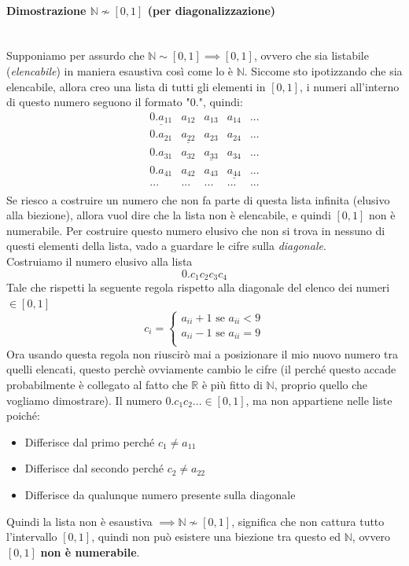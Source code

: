 \documentclass{article}
\begin{document}
\paragraph{Dimostrazione $\mathbb{N}\nsim[0,1]$ (per diagonalizzazione)}\mbox{}\\Supponiamo per assurdo che $\mathbb{N}\sim[0,1]\implies[0,1]$,
ovvero che sia listabile (\textit{elencabile}) in maniera esaustiva così come lo è $\mathbb{N}$.
Siccome sto ipotizzando che sia elencabile, allora creo una lista di tutti gli elementi in $[0,1]$, i numeri
all'interno di questo numero seguono il formato "$0.$", quindi:
\[
    \begin{array}{ccccc}
        \underline{0.a_{11}} & a_{12}             & a_{13}             & a_{14}             & ... \\
        0.a_{21}             & \underline{a_{22}} & a_{23}             & a_{24}             & ... \\
        0.a_{31}             & a_{32}             & \underline{a_{33}} & a_{34}             & ... \\
        0.a_{41}             & a_{42}             & a_{43}             & \underline{a_{44}} & ... \\
        ...                  & ...                  & ...                  & ...                  & ... \\
    \end{array}
\]
Se riesco a costruire un numero che non fa parte di questa lista infinita (elusivo alla biezione),
allora vuol dire che la lista non è elencabile, e quindi $[0,1]$ non è numerabile.
Per costruire questo numero elusivo che non si trova in nessuno di questi elementi della lista,
vado a guardare le cifre sulla \textit{diagonale}.\\Costruiamo il numero elusivo alla lista
$$0.c_1c_2c_3c_4$$
Tale che rispetti la seguente regola rispetto alla diagonale del elenco dei numeri $\in [0,1]$
\[
    c_i=
    \begin{cases}
        a_{ii} + 1\text{ se }a_{ii} < 9 \\
        a_{ii} - 1\text{ se }a_{ii} = 9 \\
    \end{cases}
\]
Ora usando questa regola non riuscirò mai a posizionare il mio nuovo numero
tra quelli elencati, questo perchè ovviamente cambio le cifre (il perché questo accade
probabilmente è collegato al fatto che $\mathbb{R}$ è più fitto di $\mathbb{N}$, proprio
quello che vogliamo dimostrare).
Il numero $0.c_1c_2...\in[0,1]$, ma non appartiene nelle liste poiché:
\begin{itemize}
    \item Differisce dal primo perché $c_1\neq a_{11}$
    \item Differisce dal secondo perché $c_2\neq a_{22}$
    \item Differisce da qualunque numero presente sulla diagonale
\end{itemize}
Quindi la lista non è esaustiva $\implies \mathbb{N}\nsim[0,1]$, significa che non cattura tutto l'intervallo $[0,1]$,
quindi non può esistere una biezione tra questo ed $\mathbb{N}$, ovvero $[0,1]$ \textbf{non è numerabile}.
\end{document}
